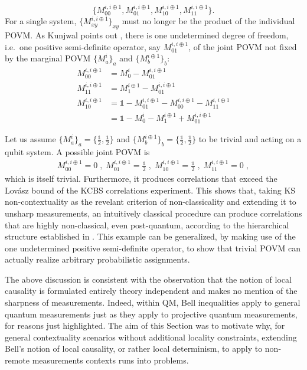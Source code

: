 \begin{itemize}
\begin{equation*}
    \{M_{00}^{i,i\oplus1}, M_{01}^{i,i\oplus1},  M_{10}^{i,i\oplus1}, M_{11}^{i,i\oplus1}\}.
    \end{equation*}
    For a single system, $\{M_{xy}^{i,i\oplus 1}\}_{xy}$ must no longer be the product of the individual POVM. As Kunjwal points out \cite{Kunjwal2019}, there is one undetermined degree of freedom, i.e.\ one positive semi-definite operator, say $M_{01}^{i,i\oplus 1}$, of the joint POVM not fixed by the marginal POVM $\{M_a^i\}_a$ and $\{M_b^{i\oplus 1}\}_b$:
    \begin{align*}
        M_{00}^{i,i\oplus 1}&=M_0^i-M_{01}^{i,i\oplus 1} \\[0.3em]
        M_{11}^{i,i\oplus 1}&=M_1^{i\oplus 1}-M_{01}^{i,i\oplus 1} \\[0.3em] M_{10}^{i,i\oplus 1}&=\mathbb{1}-M_{01}^{i,i\oplus 1}-M_{00}^{i,i\oplus 1}-M_{11}^{i,i\oplus 1} \\[0.3em]
        &=\mathbb{1}-M_0^i-M_1^{i\oplus 1}+M_{01}^{i,i\oplus 1}
    \end{align*}

Let us assume $\{M_a^i\}_a=\{\frac{\mathbb{1}}{2}, \frac{\mathbb{1}}{2}\}$ and $\{M_b^{i\oplus 1}\}_b=\{\frac{\mathbb{1}}{2}, \frac{\mathbb{1}}{2}\}$ to be trivial and acting on a qubit system. A possible joint POVM is
\begin{align*}
    M_{00}^{i,i\oplus 1}  = 0\;,\;
    M_{01}^{i,i\oplus 1}  = \frac{\mathbb{1}}{2}\;,\;
    M_{10}^{i,i\oplus 1}  = \frac{\mathbb{1}}{2}\;,\;
    M_{11}^{i,i\oplus 1}  = 0 \;,
\end{align*}
which is itself trivial. Furthermore, it produces correlations that exceed the Lovász bound of the KCBS correlations experiment. This shows that, taking KS non-contextuality as the revelant criterion of non-classicality and extending it to unsharp measurements, an intuitively classical procedure can produce correlations that are highly non-classical, even post-quantum, according to the hierarchical structure established in \cite{Cabello2014}. This example can be generalized, by making use of the one undetermined positive semi-definite operator, to show that trivial POVM can actually realize arbitrary probabilistic assignments.

The above discussion is consistent with the observation that the notion of local causality is formulated entirely theory independent and makes no mention of the sharpness of measurements. Indeed, within QM, Bell inequalities apply to general quantum measurements just as they apply to projective quantum measurements, for reasons just highlighted. The aim of this Section was to motivate why, for general contextuality scenarios without additional locality constraints, extending Bell's notion of local causality, or rather local determinism, to apply to non-remote measurements contexts runs into problems. 


\end{itemize}

